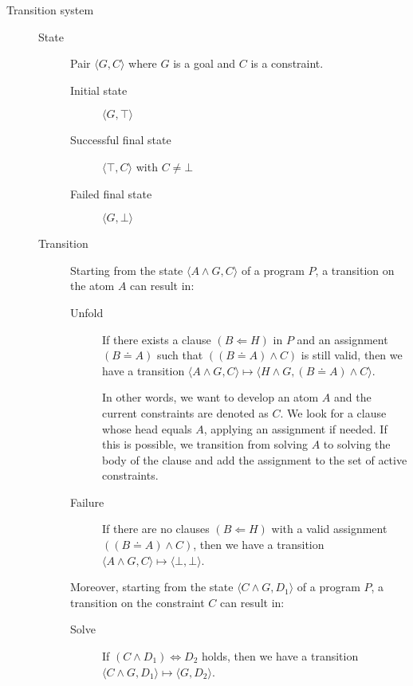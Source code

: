 \begin{description}
    \item[Transition system] 
        \phantom{}
        \begin{description}
            \item[State] Pair $\langle G, C \rangle$ where $G$ is a goal and $C$ is a constraint.
                \begin{description}
                    \item[Initial state] $\langle G, \top \rangle$ 
                    \item[Successful final state] $\langle \top, C \rangle$ with $C \neq \bot$
                    \item[Failed final state] $\langle G, \bot \rangle$
                \end{description}

            \item[Transition]
                Starting from the state $\langle A \land G, C \rangle$ of a program $P$, a transition on the atom $A$ can result in:
                \begin{description}
                    \item[Unfold] 
                        If there exists a clause $(B \Leftarrow H)$ in $P$ and 
                        an assignment $(B \doteq A)$ such that $((B \doteq A) \land C)$ is still valid,
                        then we have a transition $\langle A \land G, C \rangle \mapsto \langle H \land G, (B \doteq A) \land C \rangle$.

                        In other words, we want to develop an atom $A$ and the current constraints are denoted as $C$.
                        We look for a clause whose head equals $A$, applying an assignment if needed.
                        If this is possible, we transition from solving $A$ to solving the body of the clause and 
                        add the assignment to the set of active constraints.

                    \item[Failure] 
                        If there are no clauses $(B \Leftarrow H)$ with a valid assignment $((B \doteq A) \land C)$,
                        then we have a transition $\langle A \land G, C \rangle \mapsto \langle \bot, \bot \rangle$.
                \end{description}

                Moreover, starting from the state $\langle C \land G, D_1 \rangle$ of a program $P$, a transition on the constraint $C$ can result in:
                \begin{description}
                    \item[Solve] 
                        If $(C \land D_1) \iff D_2$ holds,
                        then we have a transition $\langle C \land G, D_1 \rangle \mapsto \langle G, D_2 \rangle$.


\end{description}
\end{description}
\end{description}
